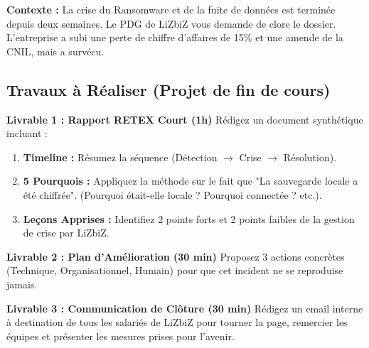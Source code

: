 \begin{boxlizbiz}
\textbf{Contexte :}
La crise du Ransomware et de la fuite de données est terminée depuis deux semaines. Le PDG de LiZbiZ vous demande de clore le dossier. L'entreprise a subi une perte de chiffre d'affaires de 15\% et une amende de la CNIL, mais a survécu.
\end{boxlizbiz}

\subsection{Travaux à Réaliser (Projet de fin de cours)}

\textbf{Livrable 1 : Rapport RETEX Court (1h)}
Rédigez un document synthétique incluant :
\begin{enumerate}
    \item \textbf{Timeline :} Résumez la séquence (Détection $\rightarrow$ Crise $\rightarrow$ Résolution).
    \item \textbf{5 Pourquois :} Appliquez la méthode sur le fait que "La sauvegarde locale a été chiffrée". (Pourquoi était-elle locale ? Pourquoi connectée ? etc.).
    \item \textbf{Leçons Apprises :} Identifiez 2 points forts et 2 points faibles de la gestion de crise par LiZbiZ.
\end{enumerate}

\textbf{Livrable 2 : Plan d'Amélioration (30 min)}
Proposez 3 actions concrètes (Technique, Organisationnel, Humain) pour que cet incident ne se reproduise jamais.

\textbf{Livrable 3 : Communication de Clôture (30 min)}
Rédigez un email interne à destination de tous les salariés de LiZbiZ pour tourner la page, remercier les équipes et présenter les mesures prises pour l'avenir.

